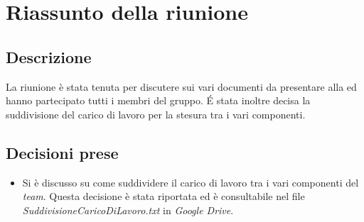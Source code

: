 \section{Riassunto della riunione}
\subsection{Descrizione}

La riunione è stata tenuta per discutere sui vari documenti da presentare alla \RR ed hanno partecipato tutti i membri del gruppo. \'E stata inoltre decisa la suddivisione del carico di lavoro per la stesura tra i vari componenti. 

\subsection{Decisioni prese}
\begin{itemize}
\item Si è discusso su come suddividere il carico di lavoro tra i vari componenti del \textit{team}. Questa decisione è stata riportata ed è consultabile nel file \textit{SuddivisioneCaricoDiLavoro.txt} in \textit{Google Drive}.
\end{itemize}

